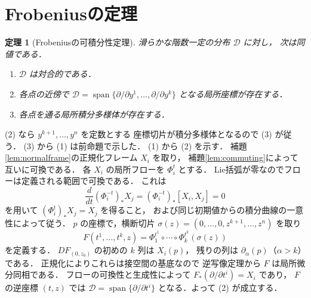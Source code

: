 \documentclass[a5paper,10pt,onecolumn]{jsarticle}
\makeatletter
\theoremstyle{mathnotetheorem}
\newtheorem{theorem}{定理}[section]
\renewcommand{\proofname}{証明}
\renewenvironment{proof}[1][\proofname]{%
  \par\pushQED{\qed}\normalfont\topsep4\p@\@plus2\p@\relax
  \trivlist\item[\hskip\labelsep\bfseries #1]\ignorespaces
}{\popQED\endtrivlist\@endpefalse}
\makeatother
\begin{document}
\section{Frobeniusの定理}
\begin{theorem}[Frobeniusの可積分性定理]\label{thm:frobenius}
滑らかな階数一定の分布 $\mathcal D$ に対し，
次は同値である．
\begin{enumerate}
\item $\mathcal D$ は対合的である．
\item 各点の近傍で
 $\mathcal D=\operatorname{span}
 \{\partial/\partial y^1,\ldots,\partial/\partial y^k\}$
 となる局所座標が存在する．
\item 各点を通る局所積分多様体が存在する．
\end{enumerate}
\end{theorem}
\begin{proof}
(2) なら $y^{k+1},\dots,y^n$ を定数とする
座標切片が積分多様体となるので (3) が従う．
(3) から (1) は前命題で示した．
(1) から (2) を示す．
補題\ref{lem:normalframe}の正規化フレーム $X_i$ を取り，
補題\ref{lem:commuting}によって互いに可換である．
各 $X_i$ の局所フローを $\Phi_i^t$ とする．
Lie括弧が零なのでフローは定義される範囲で可換である．
これは
\[
 \frac d{dt}(\Phi_i^{-t})_*X_j
 =(\Phi_i^{-t})_*[X_i,X_j]=0
\]
を用いて $(\Phi_i^t)_*X_j=X_j$ を得ること，
および同じ初期値からの積分曲線の一意性によって従う．
$p$ の座標で，横断切片
$\sigma(z)=(0,\dots,0,z^{k+1},\dots,z^n)$ を取り
\[
 F(t^1,\dots,t^k,z)=
 \Phi_1^{t^1}\circ\cdots\circ\Phi_k^{t^k}(\sigma(z))
\]
を定義する．
$DF_{(0,z_0)}$ の初めの $k$ 列は $X_i(p)$，
残りの列は $\partial_\alpha(p)$（$\alpha>k$）である．
正規化によりこれらは接空間の基底なので
逆写像定理から $F$ は局所微分同相である．
フローの可換性と生成性によって
$F_*(\partial/\partial t^i)=X_i$ であり，
$F$ の逆座標 $(t,z)$ では
$\mathcal D=\operatorname{span}\{\partial/\partial t^i\}$
となる．よって (2) が成立する．
\end{proof}
\end{document}
